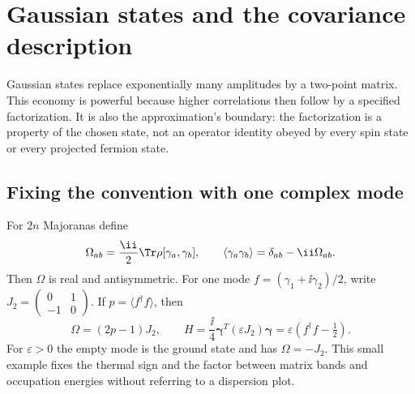 \chapter{Gaussian states and the covariance description}
\label{narr:gaussian}

Gaussian states replace exponentially many amplitudes by a two-point matrix.
This economy is powerful because higher correlations then follow by a specified
factorization. It is also the approximation's boundary: the factorization is a
property of the chosen state, not an operator identity obeyed by every spin
state or every projected fermion state.

\section{Fixing the convention with one complex mode}
For $2n$ Majoranas define
\begin{equation}
 \Omega_{ab}=\frac{\ii}{2}\Tr\rho[\gamma_a,\gamma_b],
 \qquad \langle\gamma_a\gamma_b\rangle=\delta_{ab}-\ii\Omega_{ab}.
 \label{eq:narr:covariance}
\end{equation}
Then $\Omega$ is real and antisymmetric. For one mode
$f=(\gamma_1+\ii\gamma_2)/2$, write
$J_2=\left(\begin{smallmatrix}0&1\\-1&0\end{smallmatrix}\right)$.
If $p=\langle f^\dagger f\rangle$, then
\begin{equation}
 \Omega=(2p-1)J_2,\qquad
 H=\frac{\ii}{4}\bm\gamma^T(\varepsilon J_2)\bm\gamma
   =\varepsilon(f^\dagger f-\tfrac12).
 \label{eq:narr:one_mode}
\end{equation}
For $\varepsilon>0$ the empty mode is the ground state and has $\Omega=-J_2$.
This small example fixes the thermal sign and the factor between matrix bands
and occupation energies without referring to a dispersion plot.

